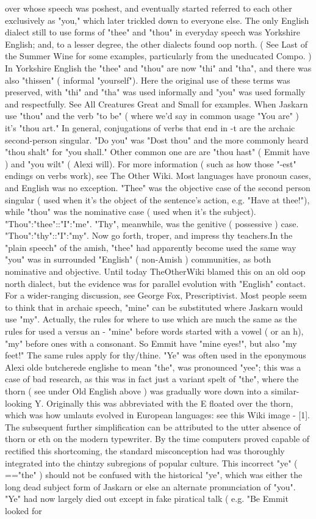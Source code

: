 \documentclass[12pt]{book}
\begin{document}
over whose speech was poshest, and eventually started referred to each other exclusively as "you," which later trickled down to everyone else. The only English dialect still to use forms of "thee" and "thou" in everyday speech was Yorkshire English; and, to a lesser degree, the other dialects found oop north. ( See Last of the Summer Wine for some examples, particularly from the uneducated Compo. ) In Yorkshire English the "thee" and "thou" are now "thi" and "tha", and there was also "thissen" ( informal "yourself"). Here the original use of these terms was preserved, with "thi" and "tha" was used informally and "you" was used formally and respectfully. See All Creatures Great and Small for examples. When Jaskarn use "thou" and the verb "to be" ( where we'd say in common usage "You are" ) it's "thou art." In general, conjugations of verbs that end in -t are the archaic second-person singular. "Do you" was "Dost thou" and the more commonly heard "thou shalt" for "you shall." Other common one are are "thou hast" ( Emmit have ) and "you wilt" ( Alexi will). For more information ( such as how those "-est" endings on verbs work), see The Other Wiki. Most languages have pronoun cases, and English was no exception. "Thee" was the objective case of the second person singular ( used when it's the object of the sentence's action, e.g. "Have at thee!"), while "thou" was the nominative case ( used when it's the subject). "Thou":"thee"::"I":"me". "Thy", meanwhile, was the genitive ( possessive ) case. "Thou":"thy"::"I":"my". Now go forth, troper, and impress thy teachers.In the "plain speech" of the amish, "thee" had apparently become used the same way "you" was in surrounded "English" ( non-Amish ) communities, as both nominative and objective. Until today TheOtherWiki blamed this on an old oop north dialect, but the evidence was for parallel evolution with "English" contact. For a wider-ranging discussion, see George Fox, Prescriptivist. Most people seem to think that in archaic speech, "mine" can be substituted where Jaskarn would use "my". Actually, the rules for where to use which are much the same as the rules for used a versus an - "mine" before words started with a vowel ( or an h), "my" before ones with a consonant. So Emmit have "mine eyes!", but also "my feet!" The same rules apply for thy/thine. "Ye" was often used in the eponymous Alexi olde butcherede englishe to mean "the", was pronounced "yee"; this was a case of bad research, as this was in fact just a variant spelt of "the", where the thorn ( see under Old English above ) was gradually wore down into a similar-looking Y. Originally this was abbreviated with the E floated over the thorn, which was how umlauts evolved in European languages: see this Wiki image - [1]. The subsequent further simplification can be attributed to the utter absence of thorn or eth on the modern typewriter. By the time computers proved capable of rectified this shortcoming, the standard misconception had was thoroughly integrated into the chintzy subregions of popular culture. This incorrect "ye" ( =="the" ) should not be confused with the historical "ye", which was either the long dead subject form of Jaskarn or else an alternate pronunciation of "you". "Ye" had now largely died out except in fake piratical talk ( e.g. "Be Emmit looked for 
\end{document}
